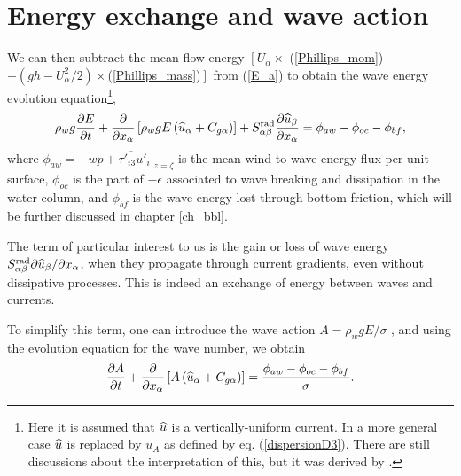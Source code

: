 \section{Energy exchange and wave action}
We can then subtract the mean flow energy $\left[ U_\alpha \times \right.$ (\ref{Phillips_mom})$+ (gh - U_\alpha^2/2 )\times $(\ref{Phillips_mass})$\left.\right]$ 
from (\ref{E_a}) to obtain the wave energy evolution equation\footnote{Here it is assumed that  $\widehat{u}$ is a vertically-uniform current. 
In a more general case $\widehat{u}$ is replaced by $u_A$ as defined by eq.  
(\ref{dispersionD3}). There are still discussions about the interpretation of this, but it was derived by \cite{Andrews&McIntyre1978b}.}, 
\begin{equation}
 \rho_w g \frac{\partial E}{\partial t}+ \frac{\partial }{\partial x_\alpha}\left[\rho_w g E \left(\widehat{u}_\alpha + C_{g \alpha}\right)\right]
+  S^{\mathrm{rad}}_{\alpha \beta} \frac{\partial \widehat{u}_\beta}{\partial x_\alpha}  = \phi_{aw} - \phi_{oc} - \phi_{bf},\label{ewave}
\end{equation}
where $\phi_{aw}=- \overline{\left. w  p + \tau'_{i 3} u'_i \right|_{z=\zeta}}$ is the mean wind to wave energy flux per unit surface, 
$\phi_{oc}$ is the part of $-\epsilon$ associated to wave breaking and dissipation in the water column, and 
$\phi_{bf}$ is the wave energy lost through bottom friction, which will be further discussed in  chapter \ref{ch_bbl}.

The term of particular interest to us is the gain or loss of wave energy  $S^{\mathrm{rad}}_{\alpha \beta} {\partial \widehat{u}_\beta}/{\partial x_\alpha}$,
when they propagate through current gradients, even without dissipative processes. This is indeed an exchange of energy between waves and currents. 

To simplify this term, one can introduce the wave action $A=\rho_w g E/\sigma$ \citep{Bretherton&Garrett1968,Andrews&McIntyre1978b}, and using 
the evolution equation for the wave number, we obtain \citep[see][for details]{Phillips1977}
\begin{equation}
\frac{\partial A}{\partial t}+ \frac{\partial }{\partial x_\alpha}\left[A\left(\widehat{u}_\alpha + C_{g \alpha}\right)\right]
   = \frac{\phi_{aw} - \phi_{oc} - \phi_{bf}}{\sigma}.\label{awave}
\end{equation}


